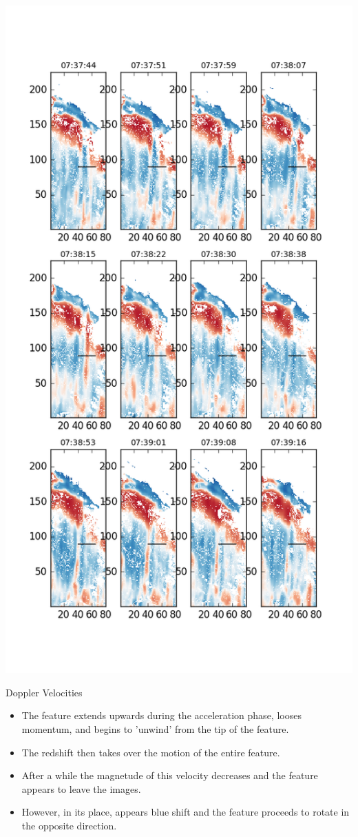 \documentclass{beamer}
\begin{document}
	\begin{frame}
		\centering
		\includegraphics[scale=0.3]{Figs/dopplergram.png}
	\end{frame}

	\begin{frame}{Doppler Velocities}
		\begin{itemize}
			\item{The feature extends upwards during the acceleration phase, looses momentum, and begins to 'unwind' from the tip of the feature.}
			\item{The redshift then takes over the motion of the entire feature.}
			\item{After a while the magnetude of this velocity decreases and the feature appears to leave the images.}
			\item{However, in its place, appears blue shift and the feature proceeds to rotate in the opposite direction.}
		\end{itemize}
	\end{frame}
\end{document}
